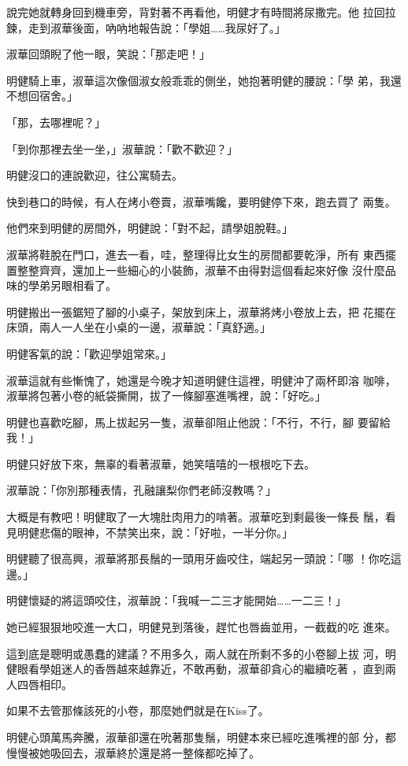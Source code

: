 說完她就轉身回到機車旁，背對著不再看他，明健才有時間將尿撒完。他
拉回拉鍊，走到淑華後面，吶吶地報告說：「學姐……我尿好了。」

淑華回頭睨了他一眼，笑說：「那走吧！」

明健騎上車，淑華這次像個淑女般乖乖的側坐，她抱著明健的腰說：「學
弟，我還不想回宿舍。」

「那，去哪裡呢？」

「到你那裡去坐一坐，」淑華說：「歡不歡迎？」

明健沒口的連說歡迎，往公寓騎去。

快到巷口的時候，有人在烤小卷賣，淑華嘴饞，要明健停下來，跑去買了
兩隻。

他們來到明健的房間外，明健說：「對不起，請學姐脫鞋。」

淑華將鞋脫在門口，進去一看，哇，整理得比女生的房間都要乾淨，所有
東西擺置整整齊齊，還加上一些細心的小裝飾，淑華不由得對這個看起來好像
沒什麼品味的學弟另眼相看了。

明健搬出一張鋸短了腳的小桌子，架放到床上，淑華將烤小卷放上去，把
花擺在床頭，兩人一人坐在小桌的一邊，淑華說：「真舒適。」

明健客氣的說：「歡迎學姐常來。」

淑華這就有些慚愧了，她還是今晚才知道明健住這裡，明健沖了兩杯即溶
咖啡，淑華將包著小卷的紙袋撕開，拔了一條腳塞進嘴裡，說：「好吃。」

明健也喜歡吃腳，馬上拔起另一隻，淑華卻阻止他說：「不行，不行，腳
要留給我！」

明健只好放下來，無辜的看著淑華，她笑嘻嘻的一根根吃下去。

淑華說：「你別那種表情，孔融讓梨你們老師沒教嗎？」

大概是有教吧！明健取了一大塊肚肉用力的啃著。淑華吃到剩最後一條長
鬚，看見明健悲傷的眼神，不禁笑出來，說：「好啦，一半分你。」

明健聽了很高興，淑華將那長鬚的一頭用牙齒咬住，端起另一頭說：「哪
！你吃這邊。」

明健懷疑的將這頭咬住，淑華說：「我喊一二三才能開始……一二三！」

她已經狠狠地咬進一大口，明健見到落後，趕忙也唇齒並用，一截截的吃
進來。

這到底是聰明或愚蠢的建議？不用多久，兩人就在所剩不多的小卷腳上拔
河，明健眼看學姐迷人的香唇越來越靠近，不敢再動，淑華卻貪心的繼續吃著
，直到兩人四唇相印。

如果不去管那條該死的小卷，那麼她們就是在Kiss了。

明健心頭萬馬奔騰，淑華卻還在吮著那隻鬚，明健本來已經吃進嘴裡的部
分，都慢慢被她吸回去，淑華終於還是將一整條都吃掉了。

